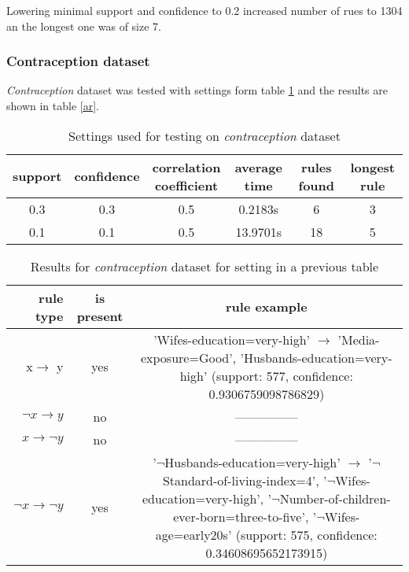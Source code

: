 \documentclass{article}
\begin{document}
	Lowering minimal support and confidence to 0.2 increased number of rues to 1304 an the longest one was of size 7.
 	
 	\subsubsection{Contraception dataset}
 	\textit{Contraception} dataset was tested with settings form table \ref{cs} and the results are shown in table \ref{ar}.
 	
 	\begin{table}[H]
 		\centering
		 \caption{Settings used for testing on \textit{contraception} dataset}
 		\label{cs}
 		\begin{tabular}{c |c |c|c|c|c}
 			support&confidence&\makecell{correlation\\coefficient}&average time&rules found&longest rule\\
 			\hline
 			\hline
 			0.3&0.3&0.5&0.2183s&6&3\\
 			\hline
 			0.1&0.1&0.5&13.9701s&18&5\\
 		\end{tabular}
 	\end{table}
 	\begin{table}[H]
 		\centering
		 \caption{Results for \textit{contraception} dataset for setting in a previous table}
 		\label{cr}
 		\begin{tabular}{r|c |c}
 			rule type& is present & rule example\\
 			\hline
 			\hline
 			x$\rightarrow$ y & yes & \makecell{'Wifes-education=very-high' $\rightarrow$\\'Media-exposure=Good', 'Husbands-education=very-high'\\ (support: 577, confidence: 0.9306759098786829)}\\
 			\hline
 			$\neg x\rightarrow y$ & no &---------------\\
 			\hline
 			$x\rightarrow \neg y $& no &---------------\\
 			\hline
 			$\neg x\rightarrow \neg y $& yes & \makecell{'$\neg$Husbands-education=very-high' $\rightarrow$\\ '$\neg$Standard-of-living-index=4', '$\neg$Wifes-education=very-high',\\ '$\neg$Number-of-children-ever-born=three-to-five',\\ '$\neg$Wifes-age=early20s'\\ (support: 575, confidence: 0.34608695652173915)}\\ 
 		\end{tabular}
 	\end{table}
 	
\end{document}
